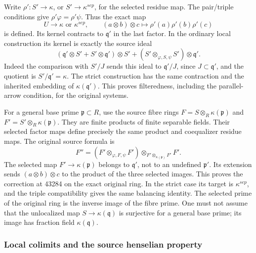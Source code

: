 Write \(\rho':S'\to\kappa\), or \(S'\to\kappa^{sep}\), for the selected residue map. The pair/triple conditions give \(\rho'\varphi=\rho'\psi\). Thus the exact map \[
 U\longrightarrow\kappa\text{ or }\kappa^{sep},\qquad
 (a\otimes b)\otimes c\longmapsto\rho'(a)\rho'(b)\rho'(c)
\] is defined. Its kernel contracts to \(\mathfrak q'\) in the last factor. In the ordinary local construction its kernel is exactly the source ideal \[
 (\mathfrak q'\otimes S'+S'\otimes\mathfrak q')\otimes S'
 +(S'\otimes_{\varphi,S,\psi}S')\otimes\mathfrak q'.
\] Indeed the comparison with \(S'/J\) sends this ideal to \(\mathfrak q'/J\), since \(J\subset\mathfrak q'\), and the quotient is \(S'/\mathfrak q'=\kappa\). The strict construction has the same contraction and the inherited embedding of \(\kappa(\mathfrak q')\). This proves filteredness, including the parallel-arrow condition, for the original systems.

For a general base prime \(\mathfrak p\subset R\), use the source fibre rings \(F=S\otimes_R\kappa(\mathfrak p)\) and \(F'=S'\otimes_R\kappa(\mathfrak p)\). They are finite products of finite separable fields. Their selected factor maps define precisely the same product and coequalizer residue maps. The original source formula is \[
 F''=(F'\otimes_{\varphi,F,\psi}F')
       \otimes_{F'\otimes_{\kappa(\mathfrak p)}F'}F'.
\] The selected map \(F'\to\kappa(\mathfrak p)\) belongs to \(\mathfrak q'\), not to an undefined \(\mathfrak p'\). Its extension sends \((a\otimes b)\otimes c\) to the product of the three selected images. This proves the correction at 43284 on the exact original ring. In the strict case its target is \(\kappa^{sep}\), and the triple compatibility gives the same balancing identity. The selected prime of the original ring is the inverse image of the fibre prime. One must not assume that the unlocalized map \(S\to\kappa(\mathfrak q)\) is surjective for a general base prime; its image has fraction field \(\kappa(\mathfrak q)\).

\subsubsection{Local colimits and the source henselian property}\label{algebra-proof-060-local-colimits-and-the-source-henselian-property}


